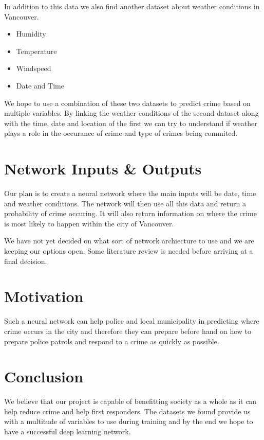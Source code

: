 \documentclass[conference]{IEEEtran}
\begin{document}
    In addition to this data we also find another dataset about weather conditions in
    Vancouver.

    \begin{itemize}
        \item Humidity
        \item Temperature
        \item Windspeed
        \item Date and Time\\
    \end{itemize}

    We hope to use a combination of these two datasets to predict crime based on multiple variables. By linking the weather
    conditions of the second dataset along with the time, date and location of the first we can try to understand if weather plays a role
    in the occurance of crime and type of crimes being commited.\\

    \section{Network Inputs \& Outputs}

    Our plan is to create a neural network where the main inputs will be date, time and weather conditions. The network will then
    use all this data and return a probability of crime occuring. It will also return information on where the
    crime is most likely to happen within the city of Vancouver.

    We have not yet decided on what sort of network archiecture to use and we are keeping our options open. Some literature review
    is needed before arriving at a final decision.

    \section{Motivation}

    Such a neural network can help police and local municipality in predicting where crime occurs in the city and
    therefore they can prepare before hand on how to prepare police patrols and respond to a crime as quickly as possible. 

    \section{Conclusion}

    We believe that our project is capable of benefitting society as a whole as it can help reduce crime and help first
    responders. The datasets we found provide us with a multitude of variables to use during training and by the end we hope
    to have a successful deep learning network.
    
\end{document}

